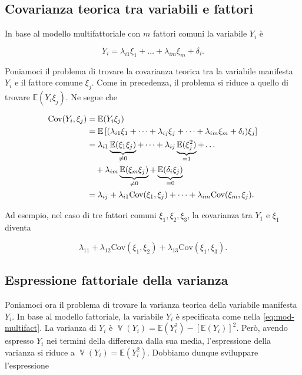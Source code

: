 \documentclass[
  11pt,
]{krantz}
\DeclareMathOperator{\V}{\mathbb{V}} %
\newcommand{\E}{\mathbb{E}} %
\theoremstyle{definition}
\theoremstyle{definition}
\theoremstyle{definition}
\theoremstyle{definition}
\theoremstyle{remark}
\begin{document}
\hypertarget{covarianza-teorica-tra-variabili-e-fattori}{%
\subsection{Covarianza teorica tra variabili e fattori}\label{covarianza-teorica-tra-variabili-e-fattori}}

In base al modello multifattoriale con \(m\) fattori comuni la variabile \(Y_i\) è

\[
Y_i = \lambda_{i1} \xi_1 + \dots + \lambda_{im} \xi_m + \delta_i.
\label{eq:mod-multifact}
\]

Poniamoci il problema di trovare la covarianza teorica tra la variabile manifesta \(Y_i\) e il fattore comune \(\xi_j\). Come in precedenza, il problema si riduce a quello di trovare \(\E(Y_i \xi_j)\). Ne segue che

\begin{equation}
\begin{aligned}
  \mbox{Cov}(Y_i, \xi_j) &= \E(Y_i \xi_j)\notag\\
  &=\E\left[(\lambda_{i1} \xi_1 + \dots + \lambda_{ij} \xi_j + \dots + \lambda_{im} \xi_m + \delta_i)\xi_j \right]\notag\\
  &= \lambda_{i1}\underbrace{\E(\xi_1\xi_j)}_{\neq 0} + \dots + \lambda_{ij}\underbrace{\E(\xi_j^2)}_{=1} + \dots \notag\\
& \quad + \lambda_{im}\underbrace{\E(\xi_m\xi_j)}_{\neq 0} + \underbrace{\E(\delta_i \xi_j)}_{=0}\notag\\
  &= \lambda_{ij} + \lambda_{i1} \mbox{Cov}(\xi_1, \xi_j) + \dots + \lambda_{im} \mbox{Cov}(\xi_m, \xi_j).
\label{eq:cov-multifatt-obli}
\end{aligned}
\end{equation}

Ad esempio, nel caso di tre fattori comuni \(\xi_1, \xi_2, \xi_3\), la covarianza tra \(Y_1\) e \(\xi_{1}\) diventa

\[
\lambda_{11} + \lambda_{12}\mbox{Cov}(\xi_1, \xi_2) + \lambda_{13}\mbox{Cov}(\xi_1, \xi_3).
\]

\hypertarget{espressione-fattoriale-della-varianza-2}{%
\subsection{Espressione fattoriale della varianza}\label{espressione-fattoriale-della-varianza-2}}

Poniamoci ora il problema di trovare la varianza teorica della variabile manifesta \(Y_i\). In base al modello fattoriale, la variabile \(Y_i\) è specificata come nella \eqref{eq:mod-multifact}. La varianza di \(Y_i\) è \(\V(Y_i) = \E(Y_i^2) -[\E(Y_i)]^2\). Però, avendo espresso \(Y_i\) nei termini della differenza dalla sua media, l'espressione della varianza si riduce a \(\V(Y_i) = \E(Y_i^2)\). Dobbiamo dunque sviluppare l'espressione
\end{document}
